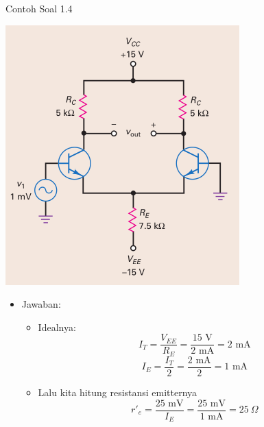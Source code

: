 \documentclass[aspectratio=169]{beamer}
\begin{document}
\begin{frame}{Contoh Soal 1.4}
	\begin{multicols}{2}
		\begin{center}
			\includegraphics[height=0.7\textheight]{gambar/01.contoh_soal_1-2}
		\end{center}
		\columnbreak
		\begin{itemize}
			\item Jawaban:
			\begin{itemize}
				\item Idealnya:
				\[ I_T = \frac{V_{EE}}{R_E} = \frac{15 \text{ V}}{2 \text{ mA}} = 2 \text{ mA}\]
				\[ I_E = \frac{I_T}{2} = \frac{2 \text{ mA}}{2} = 1 \text{ mA} \]
				\item Lalu kita hitung resistansi emitternya
				\[ r'_e = \frac{25 \text{ mV}}{ I_E} =\frac{25 \text{ mV}}{1 \text{ mA}} = 25~\Omega \]
			\end{itemize}
		\end{itemize}
	\end{multicols}
\end{frame}
\end{document}
